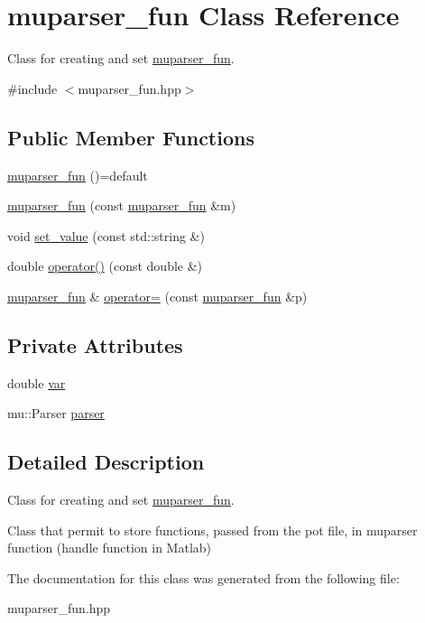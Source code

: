 \hypertarget{classmuparser__fun}{}\section{muparser\+\_\+fun Class Reference}
\label{classmuparser__fun}


Class for creating and set \hyperlink{classmuparser__fun}{muparser\+\_\+fun}.  




{\ttfamily \#include $<$muparser\+\_\+fun.\+hpp$>$}

\subsection*{Public Member Functions}
\begin{DoxyCompactItemize}
\item 
\hyperlink{group__MuParser_ga17c98796657ea4da75ca6e273f0b6965}{muparser\+\_\+fun} ()=default
\item 
\hyperlink{group__MuParser_ga106b21c0b17eb9fbc347fd510f617efb}{muparser\+\_\+fun} (const \hyperlink{classmuparser__fun}{muparser\+\_\+fun} \&m)
\item 
void \hyperlink{group__MuParser_ga1e7855a7285191f81deddf262cac949a}{set\+\_\+value} (const std\+::string \&)
\item 
double \hyperlink{group__MuParser_gad6ad244f299a60774735832c4ea28d66}{operator()} (const double \&)
\item 
\hyperlink{classmuparser__fun}{muparser\+\_\+fun} \& \hyperlink{group__MuParser_ga6e4082f4ba40e947b734195a337823d9}{operator=} (const \hyperlink{classmuparser__fun}{muparser\+\_\+fun} \&p)
\end{DoxyCompactItemize}
\subsection*{Private Attributes}
\begin{DoxyCompactItemize}
\item 
double \hyperlink{group__MuParser_gac4fe6d4c1437a4f66039268cdd304b75}{var}
\item 
mu\+::\+Parser \hyperlink{group__MuParser_gad94fb029c66d186b6fe278b51df8dfc4}{parser}
\end{DoxyCompactItemize}


\subsection{Detailed Description}
Class for creating and set \hyperlink{classmuparser__fun}{muparser\+\_\+fun}. 

Class that permit to store functions, passed from the pot file, in muparser function (handle function in Matlab) 

The documentation for this class was generated from the following file\+:\begin{DoxyCompactItemize}
\item 
muparser\+\_\+fun.\+hpp\end{DoxyCompactItemize}
